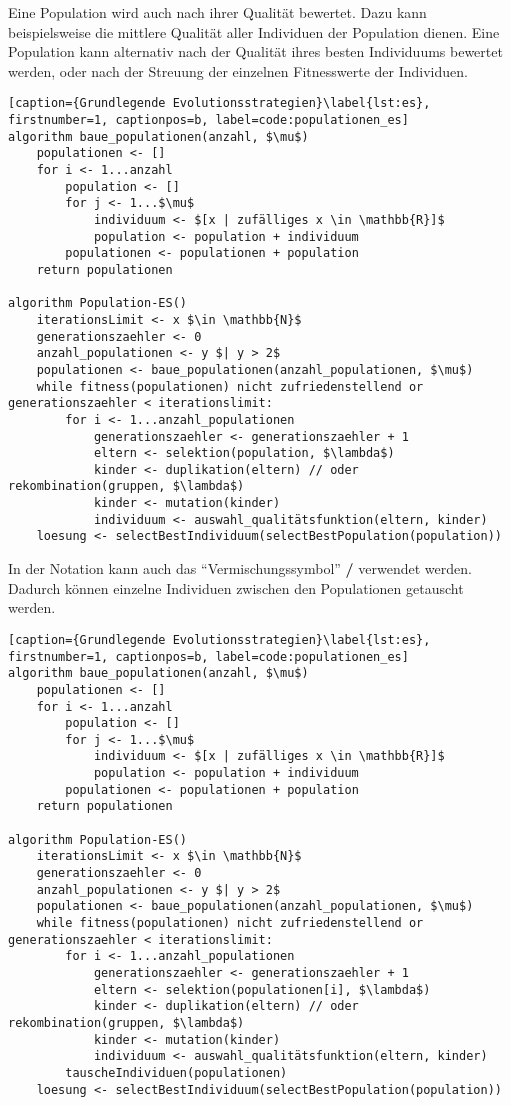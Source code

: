 Eine Population wird auch nach ihrer Qualität bewertet.
Dazu kann beispielsweise die mittlere Qualität aller Individuen der Population dienen.
Eine Population kann alternativ nach der Qualität ihres besten Individuums bewertet werden, oder nach der Streuung der einzelnen Fitnesswerte der Individuen.

\begin{lstlisting}[caption={Grundlegende Evolutionsstrategien}\label{lst:es}, firstnumber=1, captionpos=b, label=code:populationen_es]
algorithm baue_populationen(anzahl, $\mu$)
	populationen <- []
	for i <- 1...anzahl
		population <- []	
		for j <- 1...$\mu$
			individuum <- $[x | zufälliges x \in \mathbb{R}]$
			population <- population + individuum
		populationen <- populationen + population
	return populationen

algorithm Population-ES()
	iterationsLimit <- x $\in \mathbb{N}$
	generationszaehler <- 0
	anzahl_populationen <- y $| y > 2$
	populationen <- baue_populationen(anzahl_populationen, $\mu$)
	while fitness(populationen) nicht zufriedenstellend or generationszaehler < iterationslimit:
		for i <- 1...anzahl_populationen
			generationszaehler <- generationszaehler + 1
			eltern <- selektion(population, $\lambda$)
			kinder <- duplikation(eltern) // oder rekombination(gruppen, $\lambda$)
			kinder <- mutation(kinder)
			individuum <- auswahl_qualitätsfunktion(eltern, kinder)
	loesung <- selectBestIndividuum(selectBestPopulation(population))
\end{lstlisting}

In der Notation kann auch das \enquote{Vermischungssymbol} \textbf{/} verwendet werden. Dadurch können einzelne Individuen zwischen den Populationen getauscht werden.

\begin{lstlisting}[caption={Grundlegende Evolutionsstrategien}\label{lst:es}, firstnumber=1, captionpos=b, label=code:populationen_es]
algorithm baue_populationen(anzahl, $\mu$)
	populationen <- []
	for i <- 1...anzahl
		population <- []	
		for j <- 1...$\mu$
			individuum <- $[x | zufälliges x \in \mathbb{R}]$
			population <- population + individuum
		populationen <- populationen + population
	return populationen

algorithm Population-ES()
	iterationsLimit <- x $\in \mathbb{N}$
	generationszaehler <- 0
	anzahl_populationen <- y $| y > 2$
	populationen <- baue_populationen(anzahl_populationen, $\mu$)
	while fitness(populationen) nicht zufriedenstellend or generationszaehler < iterationslimit:
		for i <- 1...anzahl_populationen
			generationszaehler <- generationszaehler + 1
			eltern <- selektion(populationen[i], $\lambda$)
			kinder <- duplikation(eltern) // oder rekombination(gruppen, $\lambda$)
			kinder <- mutation(kinder)
			individuum <- auswahl_qualitätsfunktion(eltern, kinder)
		tauscheIndividuen(populationen)
	loesung <- selectBestIndividuum(selectBestPopulation(population))
\end{lstlisting}


